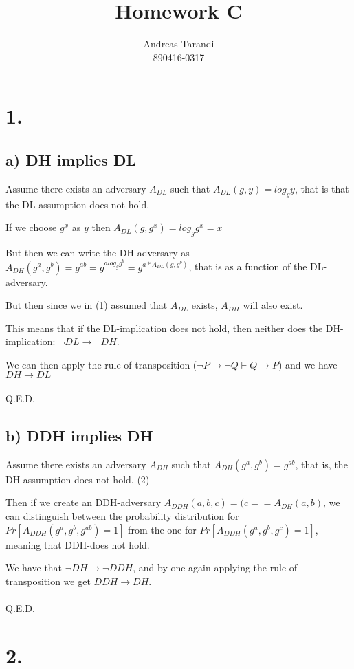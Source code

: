 \documentclass[a4paper,11pt]{article}
\author{Andreas Tarandi\\890416-0317}
\title{Homework C}
\begin{document}
	\maketitle

	\section*{1. }
		\subsection*{a) DH implies DL}
			Assume there exists an adversary $A_{DL}$ such that
			$ A_{DL}(g, y) = log_g{y} $, that is that the DL-assumption does not hold.
		
			If we choose $g^x$ as $y$ then $A_{DL}(g, g^x) = log_g{g^x} = x$

			But then we can write the DH-adversary as $A_{DH}(g^a, g^b) = g^{ab} = g^{a log_g{g^b}} = g^{a * A_{DL}(g, g^b)} $, that is as a function of the DL-adversary. 

			But then since we in (1) assumed that $A_{DL}$ exists, $A_{DH}$ will also exist.

			This means that if the DL-implication does not hold, then neither does the DH-implication: $\neg DL \to \neg DH $. 

			We can then apply the rule of transposition ($\neg P \to \neg Q \vdash Q \to P$) and we have $DH \to DL$ \\
			\\
			Q.E.D.
			
	\subsection*{b) DDH implies DH }
		
	Assume there exists an adversary $A_{DH}$ such that $ A_{DH}(g^a, g^b) = g^{ab}$, that is, the DH-assumption does not hold. (2)

	Then if we create an DDH-adversary $A_{DDH} (a, b, c) = (c == A_{DH} (a, b)$,
	we can distinguish between the probability distribution for $Pr [ A_{DDH}(g^a, g^b, g^{ab}) = 1] $ from the one for $ Pr [ A_{DDH}(g^a, g^b, g^c) = 1 ] $, meaning that DDH-does not hold.

	We have that $\neg DH \to \neg DDH$, and by one again applying the rule of transposition we get $DDH \to DH$. \\
	\\
	Q.E.D.

	\section*{2. }
\end{document}

